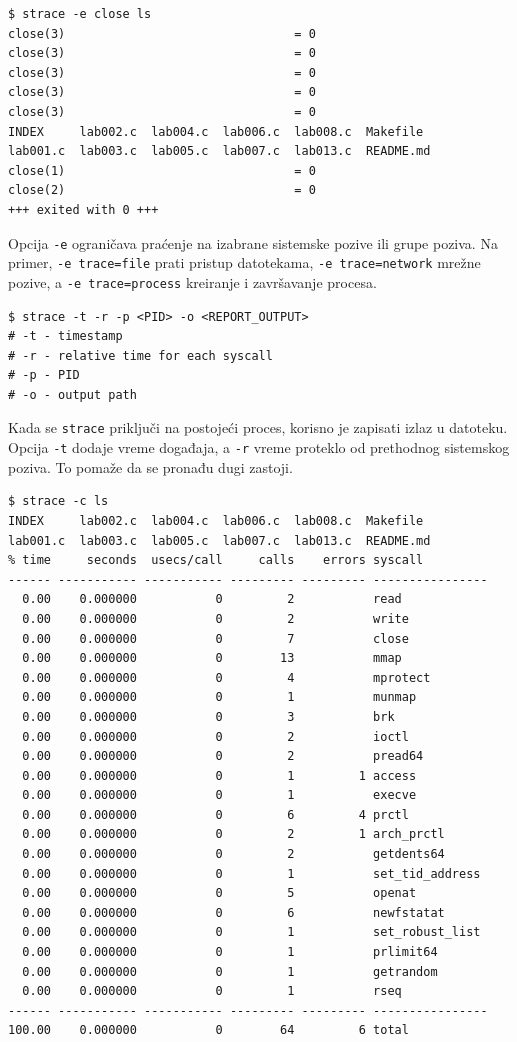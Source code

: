 \begin{verbatim}
$ strace -e close ls
close(3)                                = 0
close(3)                                = 0
close(3)                                = 0
close(3)                                = 0
close(3)                                = 0
INDEX     lab002.c  lab004.c  lab006.c  lab008.c  Makefile
lab001.c  lab003.c  lab005.c  lab007.c  lab013.c  README.md
close(1)                                = 0
close(2)                                = 0
+++ exited with 0 +++
\end{verbatim}

Opcija \texttt{-e} ograničava praćenje na izabrane sistemske pozive ili grupe poziva. Na primer, \texttt{-e trace=file} prati pristup datotekama, \texttt{-e trace=network} mrežne pozive, a \texttt{-e trace=process} kreiranje i završavanje procesa.

\begin{verbatim}
$ strace -t -r -p <PID> -o <REPORT_OUTPUT>
# -t - timestamp
# -r - relative time for each syscall
# -p - PID
# -o - output path
\end{verbatim}

Kada se \texttt{strace} priključi na postojeći proces, korisno je zapisati izlaz u datoteku. Opcija \texttt{-t} dodaje vreme događaja, a \texttt{-r} vreme proteklo od prethodnog sistemskog poziva. To pomaže da se pronađu dugi zastoji.

\begin{verbatim}
$ strace -c ls
INDEX     lab002.c  lab004.c  lab006.c  lab008.c  Makefile
lab001.c  lab003.c  lab005.c  lab007.c  lab013.c  README.md
% time     seconds  usecs/call     calls    errors syscall
------ ----------- ----------- --------- --------- ----------------
  0.00    0.000000           0         2           read
  0.00    0.000000           0         2           write
  0.00    0.000000           0         7           close
  0.00    0.000000           0        13           mmap
  0.00    0.000000           0         4           mprotect
  0.00    0.000000           0         1           munmap
  0.00    0.000000           0         3           brk
  0.00    0.000000           0         2           ioctl
  0.00    0.000000           0         2           pread64
  0.00    0.000000           0         1         1 access
  0.00    0.000000           0         1           execve
  0.00    0.000000           0         6         4 prctl
  0.00    0.000000           0         2         1 arch_prctl
  0.00    0.000000           0         2           getdents64
  0.00    0.000000           0         1           set_tid_address
  0.00    0.000000           0         5           openat
  0.00    0.000000           0         6           newfstatat
  0.00    0.000000           0         1           set_robust_list
  0.00    0.000000           0         1           prlimit64
  0.00    0.000000           0         1           getrandom
  0.00    0.000000           0         1           rseq
------ ----------- ----------- --------- --------- ----------------
100.00    0.000000           0        64         6 total

\end{verbatim}

